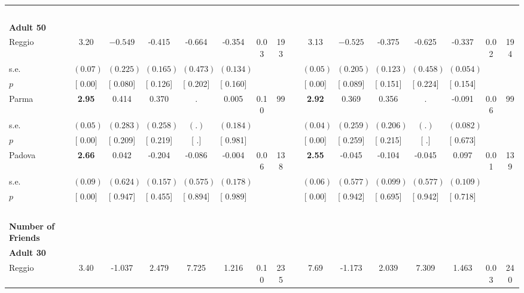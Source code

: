 \begin{longtable}{L{8em} c c c c c c c p{1em} c c c c c c c}
~\\[1em]
\quad \quad \textbf{Adult 50} & & & & & & & & & & & & & & & \\* 
\quad \quad \quad Reggio& 3.20 & $ \mathbf{   -0.549}$ &    -0.415 &    -0.664 &    -0.354 &      0.03 &       193 & & 3.13 & $ \mathbf{   -0.525}$ &    -0.375 &    -0.625 &    -0.337 &      0.02 &       194  \\*
\quad \quad \quad \quad s.e.& $ (     0.07)$ & $ (    0.225)$ & $ (    0.165)$ & $ (    0.473)$ & $ (    0.134)$ & & & & $ (     0.05)$ & $ (    0.205)$ & $ (    0.123)$ & $ (    0.458)$ & $ (    0.054)$ & &  \\*
\quad \quad \quad \quad $ p$ & [     0.00] & [    0.080] & [    0.126] & [    0.202] & [    0.160] & & & & [     0.00] & [    0.089] & [    0.151] & [    0.224] & [    0.154] & &  \\[1em]
\quad \quad \quad Parma& \textbf{     2.95} &     0.414 &     0.370 &         . &     0.005 &      0.10 &        99 & & \textbf{     2.92} &     0.369 &     0.356 &         . &    -0.091 &      0.06 &        99  \\*
\quad \quad \quad \quad s.e.& $ (     0.05)$ & $ (    0.283)$ & $ (    0.258)$ & $ (        .)$ & $ (    0.184)$ & & & & $ (     0.04)$ & $ (    0.259)$ & $ (    0.206)$ & $ (        .)$ & $ (    0.082)$ & &  \\*
\quad \quad \quad \quad $ p$ & [     0.00] & [    0.209] & [    0.219] & [        .] & [    0.981] & & & & [     0.00] & [    0.259] & [    0.215] & [        .] & [    0.673] & &  \\[1em]
\quad \quad \quad Padova& \textbf{     2.66} &     0.042 &    -0.204 &    -0.086 &    -0.004 &      0.06 &       138 & & \textbf{     2.55} &    -0.045 &    -0.104 &    -0.045 &     0.097 &      0.01 &       139  \\*
\quad \quad \quad \quad s.e.& $ (     0.09)$ & $ (    0.624)$ & $ (    0.157)$ & $ (    0.575)$ & $ (    0.178)$ & & & & $ (     0.06)$ & $ (    0.577)$ & $ (    0.099)$ & $ (    0.577)$ & $ (    0.109)$ & &  \\*
\quad \quad \quad \quad $ p$ & [     0.00] & [    0.947] & [    0.455] & [    0.894] & [    0.989] & & & & [     0.00] & [    0.942] & [    0.695] & [    0.942] & [    0.718] & &  \\[1em]
~\\[1em]
\textbf{Number of Friends} \\*
\quad \quad \textbf{Adult 30} & & & & & & & & & & & & & & & \\* 
\quad \quad \quad Reggio& 3.40 &    -1.037 & $ \mathbf{    2.479}$ &     7.725 &     1.216 &      0.10 &       235 & & 7.69 &    -1.173 &     2.039 &     7.309 &     1.463 &      0.03 &       240  \\*

\end{longtable}
